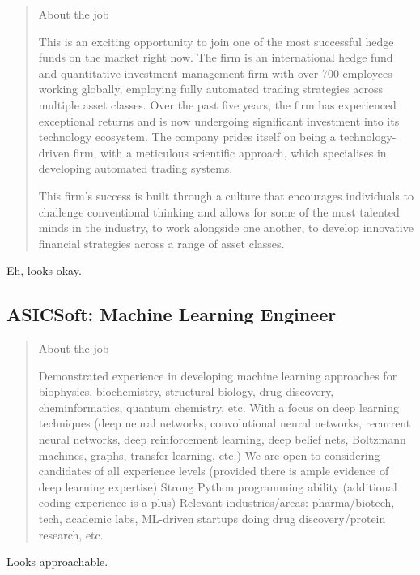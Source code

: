 \documentclass[
	letterpaper, %
	12pt, %
]{CSSullivanBusinessReport}
\begin{document}
\begin{quote}
	About the job
	
	This is an exciting opportunity to join one of the most successful hedge funds on the market right now. The firm is an international hedge fund and quantitative investment management firm with over 700 employees working globally, employing fully automated trading strategies across multiple asset classes. Over the past five years, the firm has experienced exceptional returns and is now undergoing significant investment into its technology ecosystem. The company prides itself on being a technology-driven firm, with a meticulous scientific approach, which specialises in developing automated trading systems.

	This firm's success is built through a culture that encourages individuals to challenge conventional thinking and allows for some of the most talented minds in the industry, to work alongside one another, to develop innovative financial strategies across a range of asset classes.

\end{quote}

Eh, looks okay. 


\subsection[ASICSoft]{ASICSoft: Machine Learning Engineer}

\begin{quote}
	About the job
	
    Demonstrated experience in developing machine learning approaches for biophysics, biochemistry, structural biology, drug discovery, cheminformatics, quantum chemistry, etc.
    With a focus on deep learning techniques (deep neural networks, convolutional neural networks, recurrent neural networks, deep reinforcement learning, deep belief nets, Boltzmann machines, graphs, transfer learning, etc.)
    We are open to considering candidates of all experience levels (provided there is ample evidence of deep learning expertise)
    Strong Python programming ability (additional coding experience is a plus)
    Relevant industries/areas: pharma/biotech, tech, academic labs, ML-driven startups doing drug discovery/protein research, etc.

\end{quote}

Looks approachable. 
\end{document}
